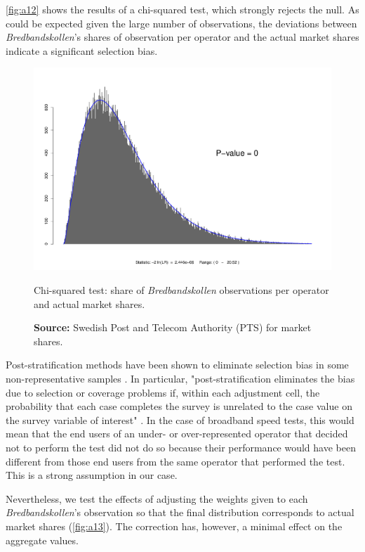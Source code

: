 \documentclass[12pt]{article}
\begin{document}
\autoref{fig:a12} shows the results of a chi-squared test, which strongly rejects the null. As could be expected given the large number of observations, the deviations between \textit{Bredbandskollen}'s shares of observation per operator and the actual market shares indicate a significant selection bias.   

\begin{figure}[H]
    \centering
        \includegraphics[width=0.6\linewidth]{multinomial.pdf}
        \caption{Chi-squared test: share of \textit{Bredbandskollen} observations per operator and actual market shares.}
        \label{fig:a12}
        \caption*{\textbf{Source:} Swedish Post and Telecom Authority (PTS) for market shares.}
\end{figure}   

Post-stratification methods have been shown to eliminate selection bias in some non-representative samples \citep{zagheni2015}. In particular, "post-stratification eliminates the bias due to selection or coverage problems if, within each adjustment cell, the probability that each case completes the survey is unrelated to the case value on the survey variable of interest" \citep{baker2013}. In the case of broadband speed tests, this would mean that the end users of an under- or over-represented operator that decided not to perform the test did not do so because their performance would have been different from those end users from the same operator that performed the test. This is a strong assumption in our case. 

Nevertheless, we test the effects of adjusting the weights given to each \textit{Bredbandskollen}'s observation so that the final distribution corresponds to actual market shares (\autoref{fig:a13}). The correction has, however, a minimal effect on the aggregate values.    
\end{document}
